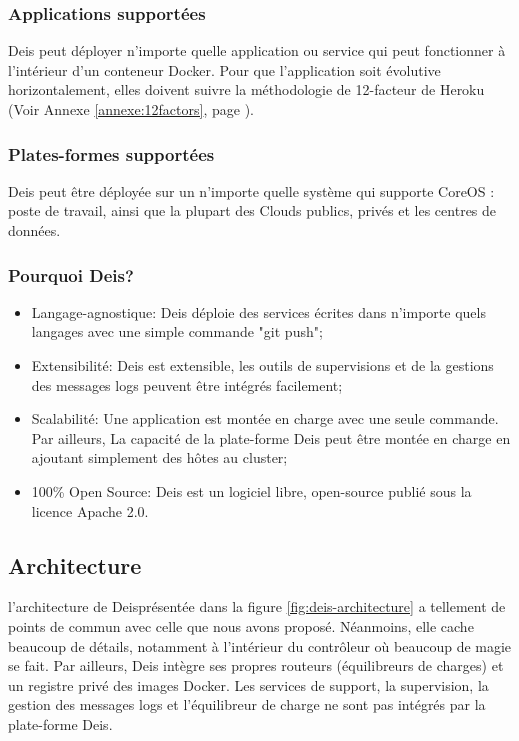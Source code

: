 \begin{onehalfspace}
\subsubsection*{Applications supportées}

Deis peut déployer n'importe quelle application ou service qui peut fonctionner à l'intérieur d'un conteneur Docker. Pour que l'application soit évolutive horizontalement, elles doivent suivre la méthodologie de 12-facteur de Heroku (Voir Annexe \ref{annexe:12factors}, page \pageref{annexe:12factors}).

\subsubsection*{Plates-formes supportées}
Deis peut être déployée sur un n'importe quelle système qui supporte CoreOS : poste de travail, ainsi que la plupart des Clouds publics, privés et les centres de données.


\subsubsection*{Pourquoi Deis?}

\begin{itemize}
	\item Langage-agnostique: Deis déploie des services écrites dans n'importe quels langages avec une simple commande "git push";
	\item Extensibilité: Deis est extensible, les outils de supervisions et de la gestions des messages logs peuvent être intégrés facilement;
	\item Scalabilité: Une application est montée en charge avec une seule commande. Par ailleurs, La capacité de la plate-forme Deis peut être montée en charge en ajoutant simplement des hôtes au cluster;
	\item 100\% Open Source: Deis est un logiciel libre, open-source publié sous la licence Apache 2.0.
\end{itemize}


\subsection{Architecture}

l'architecture de Deisprésentée dans la figure \ref{fig:deis-architecture} a tellement de points de commun avec celle que nous avons proposé. Néanmoins, elle cache beaucoup de détails, notamment à l'intérieur du contrôleur où beaucoup de magie se fait. Par ailleurs, Deis intègre ses propres routeurs (équilibreurs de charges) et un registre privé des images Docker. Les services de support, la supervision, la gestion des messages logs et l'équilibreur de charge ne sont pas intégrés par la plate-forme Deis.


\end{onehalfspace}

